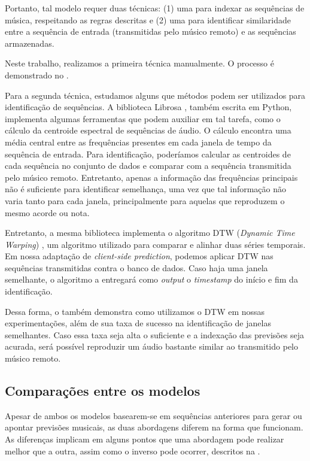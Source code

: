 Portanto, tal modelo requer duas técnicas: (1) uma para indexar as sequências de música, respeitando as regras descritas e (2) uma para identificar similaridade entre a sequência de entrada (transmitidas pelo músico remoto) e as sequências armazenadas.

Neste trabalho, realizamos a primeira técnica manualmente. O processo é demonstrado no .

Para a segunda técnica, estudamos alguns que métodos podem ser utilizados para identificação de sequências. A biblioteca Librosa \cite{librosa}, também escrita em Python, implementa algumas ferramentas que podem auxiliar em tal tarefa, como o cálculo da centroide espectral \cite{centroid} de sequências de áudio. O cálculo encontra uma média central entre as frequências presentes em cada janela de tempo da sequência de entrada. Para identificação, poderíamos calcular as centroides de cada sequência no conjunto de dados e comparar com a sequência transmitida pelo músico remoto. Entretanto, apenas a informação das frequências principais não é suficiente para identificar semelhança, uma vez que tal informação não varia tanto para cada janela, principalmente para aquelas que reproduzem o mesmo acorde ou nota.

Entretanto, a mesma biblioteca implementa o algoritmo DTW (\textit{Dynamic Time Warping}) \cite{dtw}, um algoritmo utilizado para comparar e alinhar duas séries temporais. Em nossa adaptação de \textit{client-side prediction}, podemos aplicar DTW nas sequências transmitidas contra o banco de dados. Caso haja uma janela semelhante, o algoritmo a entregará como \textit{output} o \textit{timestamp} do início e fim da identificação.

Dessa forma, o  também demonstra como utilizamos o DTW em nossas experimentações, além de sua taxa de sucesso na identificação de janelas semelhantes. Caso essa taxa seja alta o suficiente e a indexação das previsões seja acurada, será possível reproduzir um áudio bastante similar ao transmitido pelo músico remoto.

\subsection{Comparações entre os modelos}

Apesar de ambos os modelos basearem-se em sequências anteriores para gerar ou apontar previsões musicais, as duas abordagens diferem na forma que funcionam. As diferenças implicam em alguns pontos que uma abordagem pode realizar melhor que a outra, assim como o inverso pode ocorrer, descritos na .

